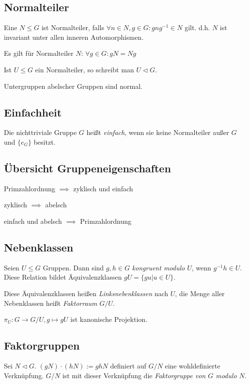\subsection*{Normalteiler}

Eine $N \leq G$ ist Normalteiler, falls $\forall n \in N, g \in G : gng^{-1} \in N$ gilt. d.h. $N$ ist invariant unter allen inneren Automorphismen.

Es gilt für Normalteiler $N$: $\forall g \in G : gN = Ng$

Ist $U \leq G$ ein Normalteiler, so schreibt man $U \triangleleft G$.

Untergruppen abelscher Gruppen sind normal.

\subsection*{Einfachheit}

Die nichttriviale Gruppe $G$ heißt \emph{einfach}, wenn sie keine Normalteiler außer $G$ und $\{e_G\}$ besitzt.

\subsection*{Übersicht Gruppeneigenschaften}

Primzahlordnung $\implies$ zyklisch und einfach

zyklisch $\implies$ abelsch

einfach und abelsch $\implies$ Primzahlordnung

\subsection*{Nebenklassen}

Seien $U \leq G$ Gruppen. Dann sind $g, h \in G$ \emph{kongruent modulo $U$}, wenn $g^{-1}h \in U$. Diese Relation bildet Äquivalenzklassen $gU = \{gu | u \in U\}$.

Diese Äquivalenzklassen heißen \emph{Linksnebenklassen} nach $U$, die Menge aller Nebenklassen heißt \emph{Faktorraum} $G/U$.

$\pi_U : G \rightarrow G/U, g \mapsto gU$ ist kanonische Projektion.

\subsection*{Faktorgruppen}

Sei $N \triangleleft G$. $(gN) \cdot (hN) := ghN$ definiert auf $G/N$ eine wohldefinierte Verknüpfung. $G/N$ ist mit dieser Verknüpfung die \emph{Faktorgruppe von $G$ modulo $N$}.

